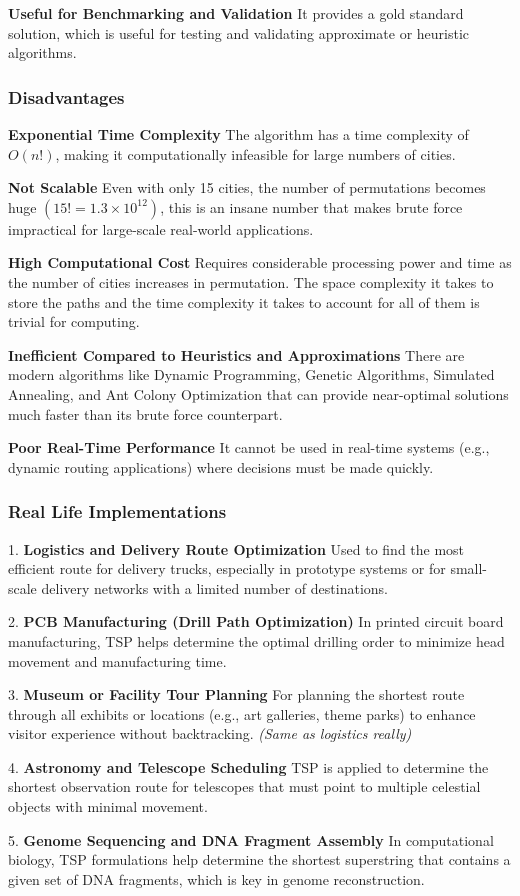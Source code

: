 \textbf{Useful for Benchmarking and Validation} 
It provides a gold standard solution, which is useful for testing and validating approximate or heuristic algorithms. 

\subsubsection{Disadvantages}
\textbf{Exponential Time Complexity} 
The algorithm has a time complexity of \(O(n!)\), making it computationally infeasible for large numbers of cities. 

\textbf{Not Scalable} 
Even with only 15 cities, the number of permutations becomes huge \((15! = 1.3 \times 10^{12})\), this is an insane number that makes brute force impractical for large-scale real-world applications. 

\textbf{High Computational Cost} 
Requires considerable processing power and time as the number of cities increases in permutation. The space complexity it takes to store the paths and the time complexity it takes to account for all of them is trivial for computing.

\textbf{Inefficient Compared to Heuristics and Approximations} 
There are modern algorithms like Dynamic Programming, Genetic Algorithms, Simulated Annealing, and Ant Colony Optimization that can provide near-optimal solutions much faster than its brute force counterpart. 

\textbf{Poor Real-Time Performance} 
It cannot be used in real-time systems (e.g., dynamic routing applications) where decisions must be made quickly. 

\subsubsection{Real Life Implementations}
1. \textbf{Logistics and Delivery Route Optimization} 
Used to find the most efficient route for delivery trucks, especially in prototype systems or for small-scale delivery networks with a limited number of destinations. 

2. \textbf{PCB Manufacturing (Drill Path Optimization)} 
In printed circuit board manufacturing, TSP helps determine the optimal drilling order to minimize head movement and manufacturing time. 

3. \textbf{Museum or Facility Tour Planning} 
For planning the shortest route through all exhibits or locations (e.g., art galleries, theme parks) to enhance visitor experience without backtracking. \textit{(Same as logistics really)}

4. \textbf{Astronomy and Telescope Scheduling} 
TSP is applied to determine the shortest observation route for telescopes that must point to multiple celestial objects with minimal movement. 

5. \textbf{Genome Sequencing and DNA Fragment Assembly} 
In computational biology, TSP formulations help determine the shortest superstring that contains a given set of DNA fragments, which is key in genome reconstruction. 

